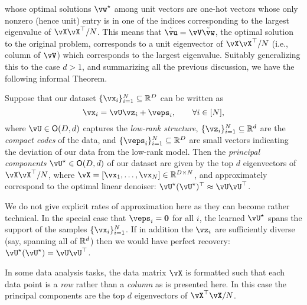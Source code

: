 \documentclass[\toplevelprefix/book-main.tex]{subfiles}
\begin{document}
whose optimal solutions \(\vw^{\star}\) among unit vectors are one-hot vectors whose only nonzero (hence unit) entry is in one of the indices corresponding to the largest eigenvalue of \(\vX\vX^{\top}/N\). This means that \(\tilde{\vu} = \vV\tilde{\vw}\), the optimal solution to the original problem, corresponds to a unit eigenvector of \(\vX\vX^{\top}/N\) (i.e., column of \(\vV\)) which corresponds to the largest eigenvalue.  Suitably generalizing this to the case \(d > 1\), and summarizing all the previous discussion, we have the following informal Theorem.
\begin{theorem}\label{thm:pca}
    Suppose that our dataset \(\{\vx_{i}\}_{i = 1}^{N} \subseteq \R^{D}\) can be written as 
    \begin{equation}
        \vx_{i} = \vU\vz_{i} + \veps_{i}, \qquad \forall i \in [N],
    \end{equation}
    where \(\vU \in \O(D, d)\) captures the \textit{low-rank structure},
    \(\{\vz_{i}\}_{i = 1}^{N} \subseteq \R^{d}\) are the \textit{compact codes}
    of the data, and \(\{\veps_{i}\}_{i = 1}^{N} \subseteq \R^{D}\) are small
    vectors indicating the deviation of our data from the low-rank model. Then
    the \textit{principal components} \(\vU^{\star} \in \O(D, d)\) of our
    dataset are given by the top \(d\) eigenvectors of \(\vX\vX^{\top}/N\),
    where \(\vX = [\vx_{1}, \dots, \vx_{N}] \in \R^{D \times N}\), and
    approximately correspond to the optimal linear denoiser:
    \(\vU^{\star}(\vU^{\star})^{\top} \approx \vU\vU^{\top}\).
\end{theorem}
We do not give explicit rates of approximation here as they can become rather
technical. In the special case that \(\veps_{i} = \vzero\) for all \(i\), the
learned \(\vU^{\star}\) spans the support of the samples \(\{\vx_{i}\}_{i
= 1}^{N}\). If in addition the \(\vz_{i}\) are sufficiently diverse (say,
spanning all of \(\mathbb{R}^{d}\)) then we would have perfect recovery:
\(\vU^{\star}(\vU^{\star}) = \vU\vU^{\top}\).


\begin{remark}
    In some data analysis tasks, the data matrix \(\vX\) is formatted such that each data point is a \textit{row} rather than a \textit{column} as is presented here. In this case the principal components are the top \(d\) eigenvectors of \(\vX^{\top}\vX/N\).
\end{remark}
\end{document}
